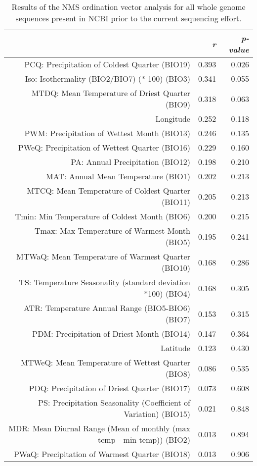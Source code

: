 \begin{table}[ht]
\centering
\begin{tabular}{rrr}
  \hline
 & {\emph{r}} & {\emph{p-value}} \\ 
  \hline
PCQ: Precipitation of Coldest Quarter (BIO19) & 0.393 & 0.026 \\ 
  Iso: Isothermality (BIO2/BIO7) (* 100) (BIO3) & 0.341 & 0.055 \\ 
  MTDQ: Mean Temperature of Driest Quarter (BIO9) & 0.318 & 0.063 \\ 
  Longitude & 0.252 & 0.118 \\ 
  PWM: Precipitation of Wettest Month (BIO13) & 0.246 & 0.135 \\ 
  PWeQ: Precipitation of Wettest Quarter (BIO16) & 0.229 & 0.160 \\ 
  PA: Annual Precipitation (BIO12) & 0.198 & 0.210 \\ 
  MAT: Annual Mean Temperature (BIO1) & 0.202 & 0.213 \\ 
  MTCQ: Mean Temperature of Coldest Quarter (BIO11) & 0.205 & 0.213 \\ 
  Tmin: Min Temperature of Coldest Month (BIO6) & 0.200 & 0.215 \\ 
  Tmax: Max Temperature of Warmest Month (BIO5) & 0.195 & 0.241 \\ 
  MTWaQ: Mean Temperature of Warmest Quarter (BIO10) & 0.168 & 0.286 \\ 
  TS: Temperature Seasonality (standard deviation *100) (BIO4) & 0.168 & 0.305 \\ 
  ATR: Temperature Annual Range (BIO5-BIO6) (BIO7) & 0.153 & 0.315 \\ 
  PDM: Precipitation of Driest Month (BIO14) & 0.147 & 0.364 \\ 
  Latitude & 0.123 & 0.430 \\ 
  MTWeQ: Mean Temperature of Wettest Quarter (BIO8) & 0.086 & 0.535 \\ 
  PDQ: Precipitation of Driest Quarter (BIO17) & 0.073 & 0.608 \\ 
  PS: Precipitation Seasonality (Coefficient of Variation) (BIO15) & 0.021 & 0.848 \\ 
  MDR: Mean Diurnal Range (Mean of monthly (max temp - min temp)) (BIO2) & 0.013 & 0.894 \\ 
  PWaQ: Precipitation of Warmest Quarter (BIO18) & 0.013 & 0.906 \\ 
   \hline
\end{tabular}
\caption{Results of the NMS ordination vector analysis for all whole genome sequences present in NCBI prior to the current sequencing effort.} 
\label{tab:wc_napg_vec}
\end{table}
